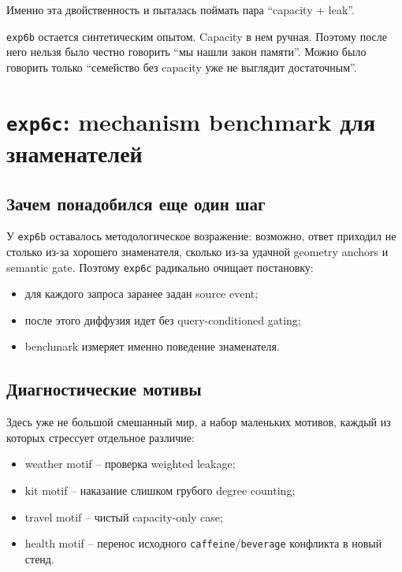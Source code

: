 Именно эта двойственность и пыталась поймать пара ``capacity + leak''.

\begin{riskbox}
\texttt{exp6b} остается синтетическим опытом. Capacity в нем ручная. Поэтому
после него нельзя было честно говорить ``мы нашли закон памяти''. Можно было
говорить только ``семейство без capacity уже не выглядит достаточным''.
\end{riskbox}

\section{\texttt{exp6c}: mechanism benchmark для знаменателей}

\subsection{Зачем понадобился еще один шаг}

У \texttt{exp6b} оставалось методологическое возражение: возможно, ответ
приходил не столько из-за хорошего знаменателя, сколько из-за удачной geometry
anchors и semantic gate. Поэтому \texttt{exp6c} радикально очищает постановку:

\begin{itemize}[leftmargin=2em]
\item для каждого запроса заранее задан source event;
\item после этого диффузия идет без query-conditioned gating;
\item benchmark измеряет именно поведение знаменателя.
\end{itemize}

\subsection{Диагностические мотивы}

Здесь уже не большой смешанный мир, а набор маленьких мотивов, каждый из которых
стрессует отдельное различие:

\begin{itemize}[leftmargin=2em]
\item weather motif -- проверка weighted leakage;
\item kit motif -- наказание слишком грубого degree counting;
\item travel motif -- чистый capacity-only case;
\item health motif -- перенос исходного \texttt{caffeine}/\texttt{beverage}
конфликта в новый стенд.
\end{itemize}

